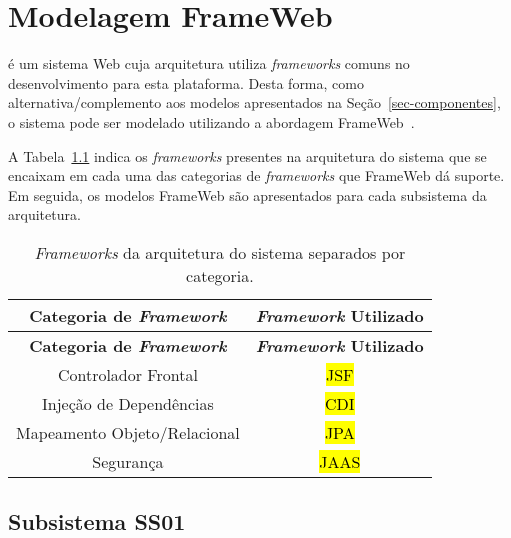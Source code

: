 
\chapter{Modelagem FrameWeb}
\label{sec-frameweb}

\emph{\imprimirtitulo} é um sistema Web cuja arquitetura utiliza \textit{frameworks} comuns no desenvolvimento para esta plataforma. Desta forma, como alternativa/complemento aos modelos apresentados na Seção~\ref{sec-componentes}, o sistema pode ser modelado utilizando a abordagem FrameWeb~\cite{souza-celebratingfalbo20}.


A Tabela~\ref{tabela-frameworks} indica os \textit{frameworks} presentes na arquitetura do sistema que se encaixam em cada uma das categorias de \textit{frameworks} que FrameWeb dá suporte. Em seguida, os modelos FrameWeb são apresentados para cada subsistema da arquitetura.

\begin{footnotesize}
	\begin{longtable}{|c|c|}
		\caption{\textit{Frameworks} da arquitetura do sistema separados por categoria.}
		\label{tabela-frameworks}\\\hline
		
		\rowcolor{lightgray}
		\textbf{Categoria de \textit{Framework}} & \textbf{\textit{Framework} Utilizado} \\\hline 
		\endfirsthead
		\hline
		\rowcolor{lightgray}
		\textbf{Categoria de \textit{Framework}} & \textbf{\textit{Framework} Utilizado} \\\hline 
		\endhead

		Controlador Frontal & \hl{JSF} \\\hline

		Injeção de Dependências & \hl{CDI} \\\hline

		Mapeamento Objeto/Relacional & \hl{JPA} \\\hline

		Segurança & \hl{JAAS} \\\hline
	\end{longtable}
\end{footnotesize}


\section{Subsistema SS01}
\label{sec-frameweb-ss01}

